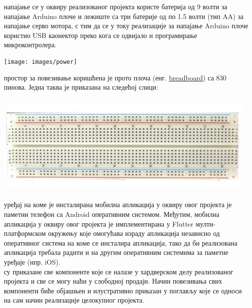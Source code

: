 \documentclass[12pt]{article}
\begin{document}
\vspace{0.2cm}
\indent{} напајање се у оквиру реализованог пројекта користе батерија од 9 волти за напајање Arduino плоче и лежиште са три батерије од по 1.5 волти (тип AA) за напајање серво мотора, с тим да се у току реализације за напајање Arduino плоче користио USB каонектор преко кога се одвијало и програмирање микроконтролера.
\vspace{0.5cm}
\begin{center}
    \centering 
    \texttt{[image: images/power]}
\end{center}
\vspace{0.5cm}
\indent{} простор за повезивање коришћена је прото плоча (енг. \href{http://www.busboard.com/documents/datasheets/BPS-DAT-(BB830)-Datasheet.pdf}{breadboard}) са 830 пинова. Једна таква је приказана на следећој слици:
\begin{center}
    \centering 
    \includegraphics[height=5cm, width=13cm]{images/breadboard}
\end{center}
\vspace{0.5cm}
\indent{} уређај на коме је инсталирана мобилна апликација у оквиру овог пројекта је паметни телефон са Android оперативним системом. Међутим, мобилна апликација у оквиру овог пројекта је имплементирана у Flutter мулти-платформском окружењу које омогућава израду апликација независно од оперативног система на коме се инсталира апликација, тако да би реализована апликација требала радити и на другим оперативним системима за паметне уређаје (нпр. iOS). \vspace{0.3cm}\\ 
 су приказане све компоненте које се налазе у хардверском делу реализованог пројекта и све се могу наћи у слободној продаји. Начин повезивања свих компоненти биће објашњен и илустративно приказан у поглављу које се односи на сам начин реализације целокупног пројекта.
\end{document}
